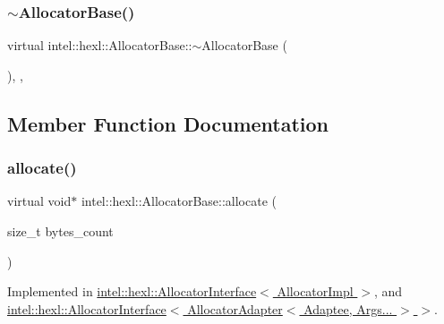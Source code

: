 \subsubsection{\texorpdfstring{$\sim$\+Allocator\+Base()}{~AllocatorBase()}}
{\footnotesize\ttfamily virtual intel\+::hexl\+::\+Allocator\+Base\+::$\sim$\+Allocator\+Base (\begin{DoxyParamCaption}{ }\end{DoxyParamCaption})\hspace{0.3cm}{\ttfamily [inline]}, {\ttfamily [virtual]}, {\ttfamily [noexcept]}}



\subsection{Member Function Documentation}
\mbox{\label{structintel_1_1hexl_1_1AllocatorBase_aadf587e7617fbace2e9d3b4f9d9e8af0}} 
\subsubsection{\texorpdfstring{allocate()}{allocate()}}
{\footnotesize\ttfamily virtual void$\ast$ intel\+::hexl\+::\+Allocator\+Base\+::allocate (\begin{DoxyParamCaption}\item[{size\+\_\+t}]{bytes\+\_\+count }\end{DoxyParamCaption})\hspace{0.3cm}{\ttfamily [pure virtual]}}



Implemented in \hyperlink{structintel_1_1hexl_1_1AllocatorInterface_a02d2d7918ea916fce443ba2f5dbaa8d1}{intel\+::hexl\+::\+Allocator\+Interface$<$ Allocator\+Impl $>$}, and \hyperlink{structintel_1_1hexl_1_1AllocatorInterface_a02d2d7918ea916fce443ba2f5dbaa8d1}{intel\+::hexl\+::\+Allocator\+Interface$<$ Allocator\+Adapter$<$ Adaptee, Args... $>$ $>$}.

\mbox{\label{structintel_1_1hexl_1_1AllocatorBase_a0f03686f9b78728d4d228ceaf4c2948e}} 
